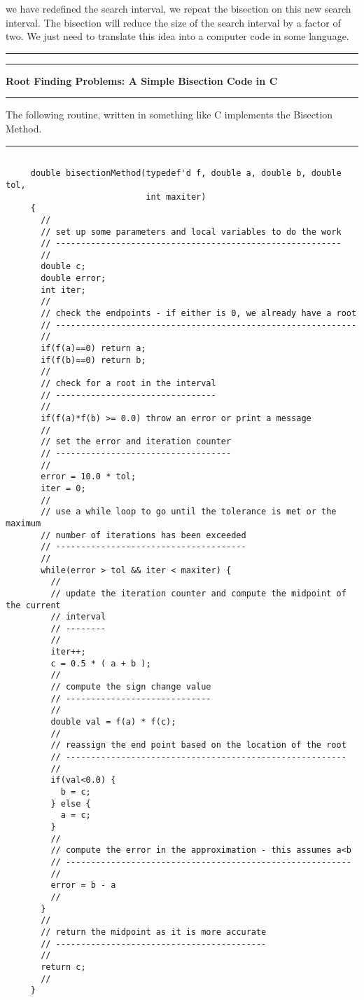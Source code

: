 \documentclass[10pt,fleqn]{article}
\begin{document}
we have redefined the search interval, we repeat the bisection on this new
search interval. The bisection will reduce the size of the search interval by
a factor of two. We just need to translate this idea into a computer code in
some language.
\vskip0.1in\hrule\vskip0.1in
\newpage
\vskip0.1in\hrule\vskip0.1in
\noindent
{\bf Root Finding Problems: A Simple Bisection Code in C}
\vskip0.1in\hrule\vskip0.1in
\noindent
The following routine, written in something like C implements the Bisection
Method.
\vskip0.1in\hrule\vskip0.1in
\begin{verbatim}

     double bisectionMethod(typedef'd f, double a, double b, double tol,
                            int maxiter)
     {
       //
       // set up some parameters and local variables to do the work
       // ---------------------------------------------------------
       //
       double c;
       double error;
       int iter;
       //
       // check the endpoints - if either is 0, we already have a root
       // ------------------------------------------------------------
       //
       if(f(a)==0) return a;
       if(f(b)==0) return b;
       //
       // check for a root in the interval
       // --------------------------------
       //
       if(f(a)*f(b) >= 0.0) throw an error or print a message
       //
       // set the error and iteration counter
       // -----------------------------------
       //
       error = 10.0 * tol;
       iter = 0;
       //
       // use a while loop to go until the tolerance is met or the maximum 
       // number of iterations has been exceeded
       // --------------------------------------
       //
       while(error > tol && iter < maxiter) {
         //
         // update the iteration counter and compute the midpoint of the current
         // interval
         // --------
         //
         iter++;
         c = 0.5 * ( a + b );
         //
         // compute the sign change value
         // -----------------------------
         //
         double val = f(a) * f(c);
         //
         // reassign the end point based on the location of the root
         // --------------------------------------------------------
         //
         if(val<0.0) {
           b = c;
         } else {
           a = c;
         }
         //
         // compute the error in the approximation - this assumes a<b
         // ---------------------------------------------------------
         //
         error = b - a
         //
       }
       //
       // return the midpoint as it is more accurate
       // ------------------------------------------
       //
       return c;
       //
     }

\end{verbatim}
\end{document}
